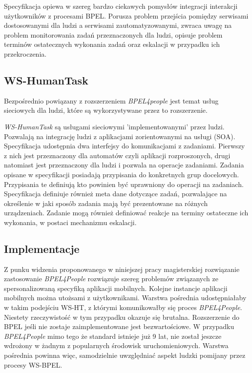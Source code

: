 Specyfikacja opiewa w szereg bardzo ciekawych pomysłów integracji interakcji użytkowników z  procesami BPEL. Porusza problem przejścia pomiędzy serwisami dostosowanymi dla ludzi a serwisami zautomatyzowanymi, zwraca uwagę na  problem monitorowania zadań przeznaczonych dla ludzi, opisuje problem terminów ostatecznych wykonania zadań oraz eskalacji w przypadku ich przekroczenia\cite[str. 6]{bpel4People}.

\subsection{WS-HumanTask}

Bezpośrednio powiązany  z rozszerzeniem \textit{BPEL4people} jest temat usług sieciowych dla ludzi, które są wykorzystywane przez to rozszerzenie.

\textit{WS-HumanTask} są usługami sieciowymi 'implementowanymi' przez ludzi. Pozwalają na integrację ludzi z aplikacjami zorientowanymi na usługi (SOA). Specyfikacja udostępnia dwa interfejsy do komunikacjami z zadaniami. Pierwszy z nich jest przeznaczony dla automatów czyli aplikacji rozproszonych, drugi natomiast jest przeznaczony dla ludzi i pozwala na operacje zadaniami.  
Zadania opisane w specyfikacji posiadają przypisania do konkretnych grup docelowych. Przypisania te definiują kto powinien być uprawniony do operacji na zadaniach. Specyfikacja definiuje również meta dane dotyczące zadań, pozwalające na określenie w jaki sposób zadania mają być prezentowane na różnych urządzeniach. Zadanie mogą również definiować reakcje na terminy ostateczne ich wykonania, w postaci mechanizmu eskalacji. 

\subsection{Implementacje}

Z punku widzenia proponowanego w niniejszej pracy magisterskiej rozwiązanie zastosowanie \textit{BPEL4People} rozwiązuje szereg problemów związanych ze spersonalizowaną specyfiką aplikacji mobilnych. Kolejne instancje aplikacji mobilnych można utożsami z użytkownikami. Warstwa pośrednia udostępniałaby w takim podejściu WS-HT, z którymi komunikowałby się proces \textit{BPEL4People}. Niestety rzeczywistość w tym przypadku okazuje się brutalna. Rozszerzenie do BPEL jeśli nie zostaje zaimplementowane jest bezwartościowe. W przypadku \textit{BPEL4People} mimo tego że standard istnieje już 9 lat, nie został jeszcze wdrożony w żadnym z popularnych środowisk uruchomieniowych.  
Warstwa pośrednia powinna więc, samodzielnie uwzględniać aspekt ludzki pomijany przez procesy WS-BPEL. 

